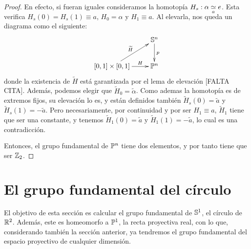 \begin{theo}
\begin{proof}
		En efecto, si fueran iguales consideramos la homotopía $H_s:\alpha\homot[a] e$. Esta verifica $H_s(0)=H_s(1)\equiv a$, $H_0=\alpha$ y $H_1\equiv a$. Al elevarla, nos queda un diagrama como el siguiente:
		\[\xymatrix{
			& \Sfe^n \ar[d]^p \\
			[0,1]\times[0,1] \ar[r]^-H \ar[ru]^{\widetilde{H}} & \proy^n
		}\]
		donde la existencia de $\widetilde{H}$ está garantizada por el lema de elevación [FALTA CITA]. Además, podemos elegir que $\widetilde{H}_0=\widetilde{\alpha}$. Como ademas la homotopía es de extremos fijos, su elevación lo es, y están definidos también $\widetilde{H}_s(0) = \widetilde{a}$ y $\widetilde{H}_s(1) = -\widetilde{a}$. Pero necesariamente, por continuidad y por ser $H_1\equiv a$, $\widetilde{H}_1$ tiene que ser una constante, y tenemos $\widetilde{H}_1(0) = \widetilde{a}$ y $\widetilde{H}_1(1)=-\widetilde{a}$, lo cual es una contradicción. %
		
		Entonces, el grupo fundamental de $\proy^n$ tiene dos elementos, y por tanto tiene que ser $\Z_2$.
	\end{proof}
\end{theo}

\section{El grupo fundamental del círculo}

El objetivo de esta sección es calcular el grupo fundamental de $\Sfe^1$, el círculo de $\R^2$. Además, este es homeomorfo a $\proy^1$, la recta proyectiva real, con lo que, considerando también la sección anterior, ya tendremos el grupo fundamental del espacio proyectivo de cualquier dimensión.

